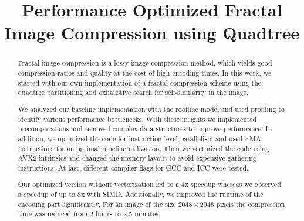 \documentclass[letterpaper]{article}
\title{Performance Optimized Fractal Image Compression using Quadtree}
\begin{document}
%
\maketitle
%
%

\setlength{\abovedisplayskip}{1ex}
\setlength{\belowdisplayskip}{1ex}

\begin{abstract}
  Fractal image compression is a lossy image compression method, which yields
  good compression ratios and quality at the cost of high encoding times. In
  this work, we started with our own implementation of a fractal compression
  scheme using the quadtree partitioning and exhaustive search for
  self-similarity in the image.

  We analyzed our baseline implementation with the roofline model and used
  profiling to identify various performance bottlenecks. With these insights we
  implemented precomputations and removed complex data structures to improve
  performance. In addition, we optimized the code for instruction level
  parallelism and used FMA instructions for an optimal pipeline utilization.
  Then we vectorized the code using AVX2 intrinsics and changed the memory
  layout to avoid expensive gathering instructions. At last, different compiler
  flags for GCC and ICC were tested.

  Our optimized version without vectorization led to a 4x speedup whereas we
  observed a speedup of up to 8x with SIMD. Additionally, we improved the
  runtime of the encoding part significantly. For an image of the size
  $2048 \times 2048$ pixels the compression time was reduced from 2 hours to 2.5
  minutes.

\end{abstract}










\end{document}
